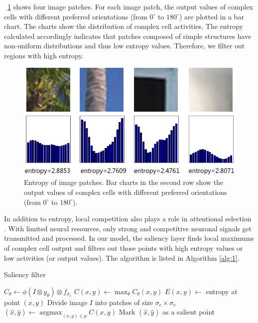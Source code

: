 \documentclass[conference]{IEEEtran}
\begin{document}
\figurename~\ref{fig:5} shows four image patches.
For each image patch, the output values of complex cells with different preferred orientations
(from $0^\circ$ to $180^\circ$) are plotted in a bar chart.
The charts show the distribution of complex cell activities.
The entropy calculated accordingly indicates that 
patches composed of simple structures have non-uniform distributions and thus low entropy values.
Therefore, we filter out regions with high entropy.

\begin{figure}[htp]
\centerline{\includegraphics[width=0.8\linewidth]{images/fig5.png}} 
\caption{Entropy of image patches.
Bar charts in the second row show the output values of complex cells
with different preferred orientations (from $0^\circ$ to $180^\circ$).}
\label{fig:5}
\end{figure}

In addition to entropy, 
local competition also plays a role in attentional selection \cite{desimone1995}.
With limited neural resources, only strong and competitive neuronal signals get transmitted and processed.
In our model, the saliency layer finds local maximums of complex cell output
and filters out those points with high entropy values or low activities (or output values).
The algorithm is listed in Algorithm \ref{alg:1}.

\begin{algorithm}[htp]
  \caption{Saliency filter}
  \label{alg:1}
  \begin{algorithmic}[1]
        \State $C_{\theta}\leftarrow\phi(I\otimes g_{\theta})\otimes f_{\sigma_c}$
      \EndFor
        \State $C(x,y)\leftarrow\max_{\theta}C_{\theta}(x,y)$
        \State $E(x,y)\leftarrow$ entropy at point $(x,y)$
      \EndFor
      \State Divide image $I$ into patches of size $\sigma_c\times\sigma_c$
        \State $(\hat{x},\hat{y})\leftarrow\operatorname{argmax}_{(x,y)\in p}C(x,y)$
          \State Mark $(\hat{x},\hat{y})$ as a salient point
        \EndIf
      \EndFor
    \EndProcedure
  \end{algorithmic}
\end{algorithm}
\end{document}
